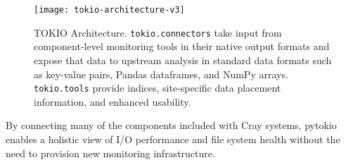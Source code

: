 \begin{figure}[t]
    \centering
    \texttt{[image: tokio-architecture-v3]}
    \vspace{-.3in}
    \caption{TOKIO Architecture.  \texttt{tokio.connectors} take input from component-level monitoring tools in their native output formats and expose that data to upstream analysis in standard data formats such as key-value pairs, Pandas dataframes, and NumPy arrays. \texttt{tokio.tools} provide indices, site-specific data placement information, and enhanced usability.}
    \label{fig:tokio-architecture}
    \vspace{-.2in}
\end{figure}

By connecting many of the components included with Cray systems, pytokio enables a holistic view of I/O performance and file system health without the need to provision new monitoring infrastructure.